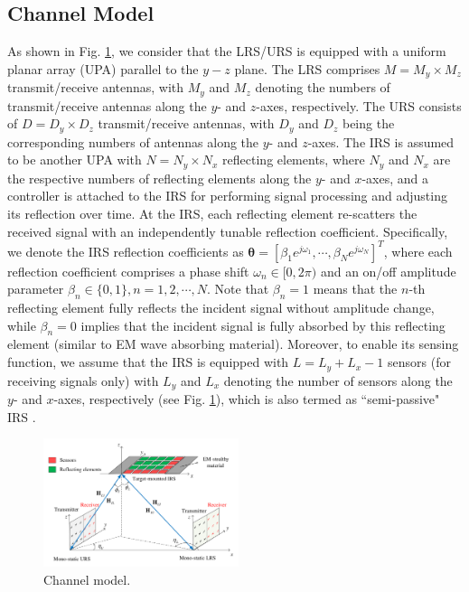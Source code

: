\documentclass[10pt,final,doublecolumn]{IEEEtran}
\begin{document}
\subsection{Channel Model}
As shown in Fig. \ref{channel_model}, we consider that the LRS/URS is equipped with a uniform planar array (UPA) parallel to the $y-z$ plane. The LRS comprises $M=M_{{y}}\times M_{{z}}$ transmit/receive antennas, with $M_{{y}}$ and $M_{{z}}$ denoting the numbers of transmit/receive antennas along the $y$- and $z$-axes, respectively. The URS consists of $D=D_{{y}}\times D_{{z}}$ transmit/receive antennas, with $D_{{y}}$ and $D_{{z}}$ being the corresponding numbers of antennas along the $y$- and $z$-axes. The IRS is assumed to be another UPA with $N=N_y\times N_x$ reflecting elements, where
$N_y$ and $N_x$ are the respective numbers of reflecting elements along the $y$- and $x$-axes, and a controller is attached to the IRS for performing signal processing and adjusting its reflection over time. At the IRS, each reflecting element re-scatters the received signal with an independently tunable reflection coefficient. Specifically, we denote the IRS reflection coefficients as $\boldsymbol{\theta}=[\beta_1 e^{j\omega_1}, \cdots, \beta_N e^{j\omega_N}]^T$, where each reflection coefficient comprises a phase shift $\omega_n \in [0,2\pi)$ and an on/off amplitude parameter $\beta_n \in \{0,1\}, n=1,2,\cdots,N$. Note that $\beta_n=1$ means that the $n$-th reflecting element fully reflects the incident signal without amplitude change, while $\beta_n=0$ implies that the incident signal is fully absorbed by this reflecting element (similar to EM wave absorbing material). Moreover, to enable its sensing function, we assume that the IRS is equipped with $L=L_y+L_x-1$ sensors (for receiving signals only) with $L_y$ and $L_x$ denoting the number of sensors along the $y$- and $x$-axes, respectively (see Fig. \ref{channel_model}), which is also termed as ``semi-passive" IRS \cite{qing}.
\begin{figure}[t!]
\setlength{\abovecaptionskip}{-0.cm}
\setlength{\belowcaptionskip}{0.cm}
  \centering
\includegraphics [width=0.51\textwidth] {channel_model.pdf}
\caption{Channel model.}
\label{channel_model}
\end{figure}
\end{document}
